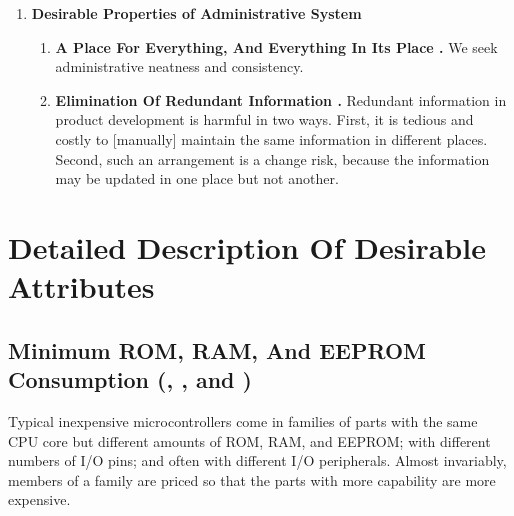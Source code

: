 \begin{enumerate}
\item \textbf{Desirable Properties of Administrative System}

\begin{enumerate}

\item \textbf{A Place For Everything, And Everything In Its Place
      \desirablepropertyemit\label{dp:chgr0:soda0:placeforeverything}.}  
	  We seek administrative
      neatness and consistency.

\item \textbf{Elimination Of Redundant Information
      \desirablepropertyemit\label{dp:chgr0:soda0:lackredinfo}.}  
	  Redundant information in product
      development is harmful in two ways.  First, it is tedious and costly to [manually] maintain
      the same information in different places.  Second, such an arrangement is a change
      risk, because the information may be updated in one place but not another.

\end{enumerate}

\end{enumerate}

\section{Detailed Description Of Desirable Attributes}
\label{chgr0:sdda0}


\subsection[Minimum ROM, RAM, And EEPROM Consumption]
           {Minimum ROM, RAM, And EEPROM Consumption 
           (,
		   ,
		   and 
		   )}
\label{chgr0:sdda0:mre0}

Typical inexpensive microcontrollers come in families of parts with
the same CPU core but different amounts of ROM, RAM, and EEPROM; with different
numbers of I/O pins; and often with different I/O peripherals.  
Almost invariably, members of a 
family are priced so that the parts with more capability are more expensive.

